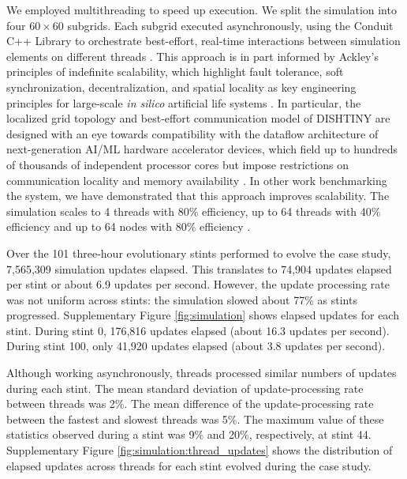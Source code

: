 We employed multithreading to speed up execution.
We split the simulation into four $60\times60$ subgrids.
Each subgrid executed asynchronously, using the Conduit C++ Library  to orchestrate best-effort, real-time interactions between simulation elements on different threads .
This approach is in part informed by Ackley's principles of indefinite scalability, which highlight fault tolerance, soft synchronization, decentralization, and spatial locality as key engineering principles for large-scale \textit{in silico} artificial life systems \citep{ackley2014indefinitely,ackley2023robust}.
In particular, the localized grid topology and best-effort communication model of DISHTINY are designed with an eye towards compatibility with the dataflow architecture of next-generation AI/ML hardware accelerator devices, which field up to hundreds of thousands of independent processor cores but impose restrictions on communication locality and memory availability \citep{lauterbach2021path,moreno2024trackable}.
In other work benchmarking the system, we have demonstrated that this approach improves scalability.
The simulation scales to 4 threads with 80\% efficiency, up to 64 threads with 40\% efficiency and up to 64 nodes with 80\% efficiency .

Over the 101 three-hour evolutionary stints performed to evolve the case study, 7,565,309 simulation updates elapsed.
This translates to 74,904 updates elapsed per stint or about 6.9 updates per second.
However, the update processing rate was not uniform across stints: the simulation slowed about 77\% as stints progressed.
Supplementary Figure \ref{fig:simulation} shows elapsed updates for each stint.
During stint 0, 176,816 updates elapsed (about 16.3 updates per second).
During stint 100, only 41,920 updates elapsed (about 3.8 updates per second).

Although working asynchronously, threads processed similar numbers of updates during each stint.
The mean standard deviation of update-processing rate between threads was 2\%.
The mean difference of the update-processing rate between the fastest and slowest threads was 5\%.
The maximum value of these statistics observed during a stint was 9\% and 20\%, respectively, at stint 44.
Supplementary Figure \ref{fig:simulation:thread_updates} shows the distribution of elapsed updates across threads for each stint evolved during the case study.
